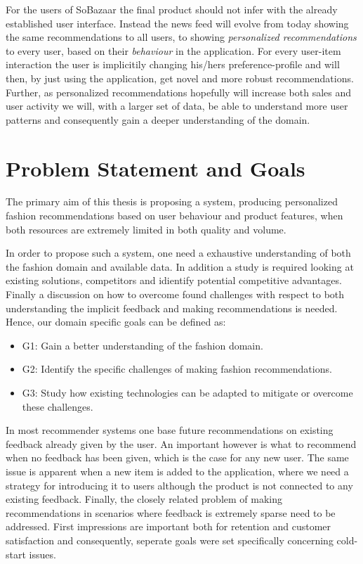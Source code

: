 For the users of SoBazaar the final product should not infer with the already
established user interface. Instead the news feed will evolve from today
showing the same recommendations to all users, to showing \textit{personalized
recommendations} to every user, based on their \textit{behaviour} in the
application. For every user-item interaction the user is implicitily changing
his/hers preference-profile and will then, by just using the application, get
novel and more robust recommendations. Further, as personalized recommendations
hopefully will increase both sales and user activity we will, with a larger set
of data, be able to understand more user patterns and consequently gain a
deeper understanding of the domain.

\section{Problem Statement and Goals}

The primary aim of this thesis is proposing a system, producing personalized
fashion recommendations based on user behaviour and product features, when both
resources are extremely limited in both quality and volume.

In order to propose such a system, one need a exhaustive understanding of both
the fashion domain and available data. In addition a study is required looking
at existing solutions, competitors and idientify potential competitive
advantages. Finally a discussion on how to overcome found challenges with
respect to both understanding the implicit feedback and making recommendations
is needed. Hence, our domain specific goals can be defined as:

\begin{itemize}
	\item G1: Gain a better understanding of the fashion domain.
  \item G2: Identify the specific challenges of making fashion recommendations.
  \item G3: Study how existing technologies can be adapted to mitigate or
  overcome these challenges.
\end{itemize}

In most recommender systems one base future recommendations on existing
feedback already given by the user. An important however is what to recommend
when no feedback has been given, which is the case for any new user. The same
issue is apparent when a new item is added to the application, where we need a
strategy for introducing it to users although the product is not connected to
any existing feedback. Finally, the closely related problem of making
recommendations in scenarios where feedback is extremely sparse need to be
addressed. First impressions are important both for retention and customer
satisfaction and consequently, seperate goals were set specifically concerning
cold-start issues.

